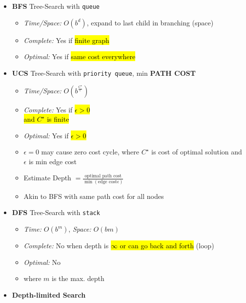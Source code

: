 \documentclass[10pt,landscape]{article}
\begin{document}
\begin{multicols*}{3}
\begin{multicols*}{2}
\begin{itemize}[topsep=0pt,noitemsep,wide=0pt, leftmargin=\dimexpr{} + 2\relax]
  \item \textbf{BFS} Tree-Search with \verb|queue|
  \begin{itemize}[topsep=0pt,noitemsep,wide=0pt, leftmargin=\dimexpr{} + 2\relax]
    \item \textit{Time/Space:} $O(b^d)$, expand to last child in branching (space)
    \item \textit{Complete:} Yes if \hl{finite graph}
    \item \textit{Optimal:} Yes if \hl{same cost everywhere}
  \end{itemize}
  \item \textbf{UCS} Tree-Search with \verb|priority queue|, min \textbf{PATH COST}
  \begin{itemize}[topsep=0pt,noitemsep,wide=0pt, leftmargin=\dimexpr{} + 2\relax]
    \item \textit{Time/Space:} $O(b^\frac{C^{\star}}{\epsilon})$
    \item \textit{Complete:} Yes if \hl{$\epsilon > 0$ \\ and $C^{\star}$ is finite}
    \item \textit{Optimal:} Yes if \hl{$\epsilon > 0$}
    \item $\epsilon = 0$ may cause zero cost cycle, where $C^{\star}$ is cost of optimal solution and $\epsilon$ is min edge cost
    \item Estimate Depth $= \frac{\text{optimal path cost}}{\min(\text{edge cost} \epsilon)}$
    \item Akin to BFS with same path cost for all nodes
  \end{itemize}
  \item \textbf{DFS} Tree-Search with \verb|stack|
  \begin{itemize}[topsep=0pt,noitemsep,wide=0pt, leftmargin=\dimexpr{} + 2\relax]
    \item \textit{Time:} $O(b^m)$, \textit{Space:} $O(bm)$
    \item \textit{Complete:} No when depth is \hl{$\infty$ or can go back and forth} (loop)
    \item \textit{Optimal:} No
    \item where $m$ is the max. depth
  \end{itemize}
  \columnbreak
  \item \textbf{Depth-limited Search} 

\end{itemize}
\end{multicols*}
\end{multicols*}
\end{document}
